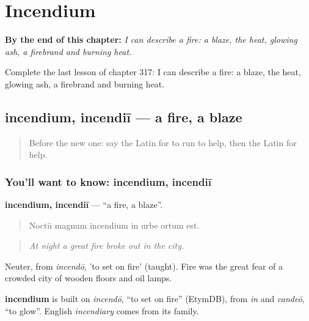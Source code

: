 
\chapter{Incendium}
\label{ch:la-incendium}

\begin{chapteropening}
\textbf{By the end of this chapter:} \emph{I can describe a fire: a blaze, the heat, glowing ash, a firebrand and burning heat.}

Complete the last lesson of chapter 317: I can describe a fire: a blaze, the heat, glowing ash, a firebrand and burning heat.
\end{chapteropening}

\section[incendium, incendiī]{incendium, incendiī — a fire, a blaze}

\label{lesson:LA-C317-incendium}



\begin{quote}
Before the new one: say the Latin for to run to help, then the Latin for help.
\end{quote}

\subsection*{You'll want to know: incendium, incendiī}
\textbf{incendium, incendiī} — \textquotedblleft{}a fire, a blaze\textquotedblright{}.

\begin{quote}
Noctū magnum incendium in urbe ortum est.
\end{quote}

\begin{quote}
\emph{At night a great fire broke out in the city.}
\end{quote}

Neuter, from \emph{incendō}, 'to set on fire' (taught). Fire was the great fear of a crowded city of wooden floors and oil lamps.

\begin{cousinweb}
\textbf{incendium} is built on \emph{incendō}, \textquotedblleft{}to set on fire\textquotedblright{} (EtymDB), from \emph{in} and \emph{candeō}, \textquotedblleft{}to glow\textquotedblright{}. English \emph{incendiary} comes from its family.
\end{cousinweb}

